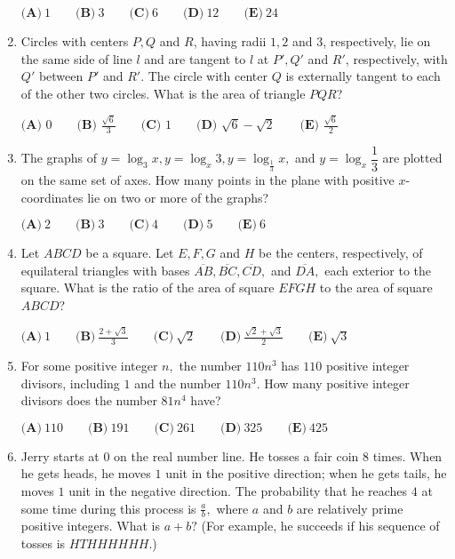 \documentclass{article}
\begin{document}
\begin{enumerate}[label=\arabic*., itemsep=0.5em]
$\textbf{(A)}\ 1\qquad\textbf{(B)}\ 3\qquad\textbf{(C)}\ 6\qquad\textbf{(D)}\ 12\qquad\textbf{(E)}\ 24$\par \vspace{0.5em}\item Circles with centers $P, Q$ and $R$, having radii $1, 2$ and $3$, respectively, lie on the same side of line $l$ and are tangent to $l$ at $P', Q'$ and $R'$, respectively, with $Q'$ between $P'$ and $R'$. The circle with center $Q$ is externally tangent to each of the other two circles. What is the area of triangle $PQR$?

$\textbf{(A) } 0\qquad \textbf{(B) } \frac{\sqrt{6}}{3}\qquad\textbf{(C) } 1\qquad\textbf{(D) } \sqrt{6}-\sqrt{2}\qquad\textbf{(E) }\frac{\sqrt{6}}{2}$\par \vspace{0.5em}\item The graphs of $y=\log_3 x, y=\log_x 3, y=\log_\frac{1}{3} x,$ and $y=\log_x \dfrac{1}{3}$ are plotted on the same set of axes. How many points in the plane with positive $x$-coordinates lie on two or more of the graphs? 

$\textbf{(A)}\ 2\qquad\textbf{(B)}\ 3\qquad\textbf{(C)}\ 4\qquad\textbf{(D)}\ 5\qquad\textbf{(E)}\ 6$\par \vspace{0.5em}\item Let $ABCD$ be a square. Let $E, F, G$ and $H$ be the centers, respectively, of equilateral triangles with bases $\overline{AB}, \overline{BC}, \overline{CD},$ and $\overline{DA},$ each exterior to the square. What is the ratio of the area of square $EFGH$ to the area of square $ABCD$? 

$\textbf{(A)}\ 1\qquad\textbf{(B)}\ \frac{2+\sqrt{3}}{3} \qquad\textbf{(C)}\ \sqrt{2} \qquad\textbf{(D)}\ \frac{\sqrt{2}+\sqrt{3}}{2} \qquad\textbf{(E)}\ \sqrt{3}$\par \vspace{0.5em}\item For some positive integer $n,$ the number $110n^3$ has $110$ positive integer divisors, including $1$ and the number $110n^3.$ How many positive integer divisors does the number $81n^4$ have? 

$\textbf{(A)}\ 110\qquad\textbf{(B)}\ 191\qquad\textbf{(C)}\ 261\qquad\textbf{(D)}\ 325\qquad\textbf{(E)}\ 425$\par \vspace{0.5em}\item Jerry starts at $0$ on the real number line. He tosses a fair coin $8$ times. When he gets heads, he moves $1$ unit in the positive direction; when he gets tails, he moves $1$ unit in the negative direction. The probability that he reaches $4$ at some time during this process is $\frac{a}{b},$ where $a$ and $b$ are relatively prime positive integers. What is $a + b?$ (For example, he succeeds if his sequence of tosses is $HTHHHHHH.$)


\end{enumerate}
\end{document}
